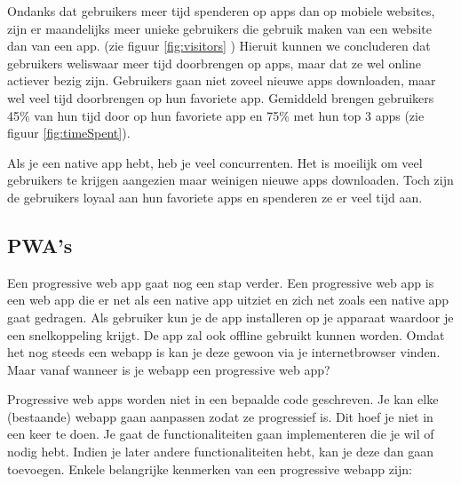 Ondanks dat gebruikers meer tijd spenderen op apps dan op mobiele websites, zijn er maandelijks meer unieke gebruikers die gebruik maken van een website dan van een app. (zie figuur \ref{fig:visitors} ) Hieruit kunnen we concluderen dat gebruikers weliswaar meer tijd doorbrengen op apps, maar dat ze wel online actiever bezig zijn. Gebruikers gaan niet zoveel nieuwe apps downloaden, maar wel veel tijd doorbrengen op hun favoriete app. Gemiddeld brengen gebruikers 45\% van hun tijd door op hun favoriete app en 75\% met hun top 3 apps (zie figuur \ref{fig:timeSpent}).

Als je een native app hebt, heb je veel concurrenten. Het is moeilijk om veel gebruikers te krijgen aangezien maar weinigen nieuwe apps downloaden. Toch zijn de gebruikers loyaal aan hun favoriete apps en spenderen ze er veel tijd aan.


\subsection{PWA's}
Een progressive web app gaat nog een stap verder. Een progressive web app is een web app die er net als een native app uitziet en zich net zoals een native app gaat gedragen. Als gebruiker kun je de app installeren op je apparaat waardoor je een snelkoppeling krijgt. De app zal ook offline gebruikt kunnen worden. Omdat het nog steeds een webapp is kan je deze gewoon via je internetbrowser vinden. Maar vanaf wanneer is je webapp een progressive web app? 

Progressive web apps worden niet in een bepaalde code geschreven. Je kan elke (bestaande) webapp gaan aanpassen zodat ze progressief is. Dit hoef je niet in een keer te doen. Je gaat de functionaliteiten gaan implementeren die je wil of nodig hebt. Indien je later andere functionaliteiten hebt, kan je deze dan gaan toevoegen.
Enkele belangrijke kenmerken van een progressive webapp zijn:

